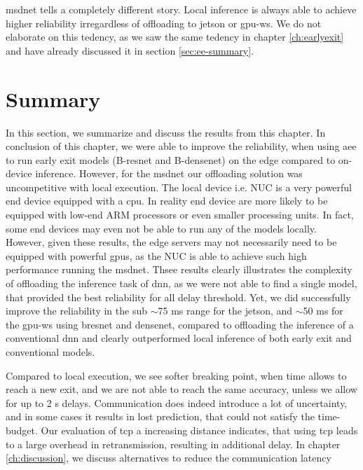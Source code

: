 \gls{msdnet} tells a completely different story. Local inference is always able to achieve higher reliability irregardless of offloading to \gls{jetson} or \gls{gpu-ws}. We do not elaborate on this tedency, as we saw the same tedency in chapter \ref{ch:earlyexit} and have already discussed it in section \ref{sec:ee-summary}.

\section{Summary} \label{sec:edge-summary}

In this section, we summarize and discuss the results from this chapter. In conclusion of this chapter, we were able to improve the reliability, when using \gls{aee} to run early exit models (B-\gls{resnet} and B-\gls{densenet}) on the edge compared to on-device inference. However, for the \gls{msdnet} our offloading solution was uncompetitive with local execution. The local device i.e. NUC is a very powerful end device equipped with a \gls{cpu}. In reality end device are more likely to be equipped with low-end ARM processors or even smaller processing units. In fact, some end devices may even not be able to run any of the models locally. However, given these results, the edge servers may not necessarily need to be equipped with powerful \gls{gpu}s, as the NUC is able to achieve such high performance running the \gls{msdnet}. Thsee results clearly illustrates the complexity of offloading the inference task of \gls{dnn}, as we were not able to find a single model, that provided the best reliability for all delay threshold. Yet, we did successfully improve the reliability in the sub $ \sim $75 ms range for the \gls{jetson}, and $ \sim $50 ms for the \gls{gpu-ws} using \gls{bresnet} and \gls{densenet}, compared to offloading the inference of a conventional \gls{dnn} and clearly outperformed local inference of both early exit and conventional models. 

Compared to local execution, we see softer breaking point, when time allows to reach a new exit, and we are not able to reach the same accuracy, unless we allow for up to 2 s delays. Communication does indeed introduce a lot of uncertainty, and in some cases it results in lost prediction, that could not satisfy the time-budget. Our evaluation of \gls{tcp} a increasing distance indicates, that using \gls{tcp} leads to a large overhead in retransmission, resulting in additional delay. In chapter \ref{ch:discussion}, we discuss alternatives to reduce the communication latency 

